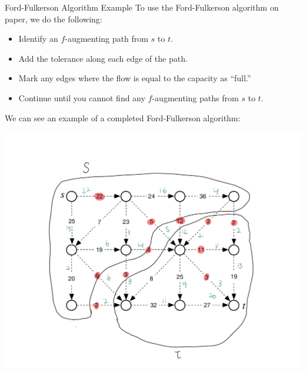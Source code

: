 \documentclass[10pt]{extarticle}
\begin{document}
  \begin{problem}{Ford-Fulkerson Algorithm Example}
    To use the Ford-Fulkerson algorithm on paper, we do the following:
    \begin{itemize}
      \item Identify an $f$-augmenting path from $s$ to $t$.
      \item Add the tolerance along each edge of the path.
      \item Mark any edges where the flow is equal to the capacity as ``full.''
      \item Continue until you cannot find any $f$-augmenting paths from $s$ to $t$.
    \end{itemize}
    We can see an example of a completed Ford-Fulkerson algorithm:
    \begin{center}
      \includegraphics[width=\textwidth]{MaxFlowMinCutExample}
    \end{center}
  \end{problem}
\end{document}
